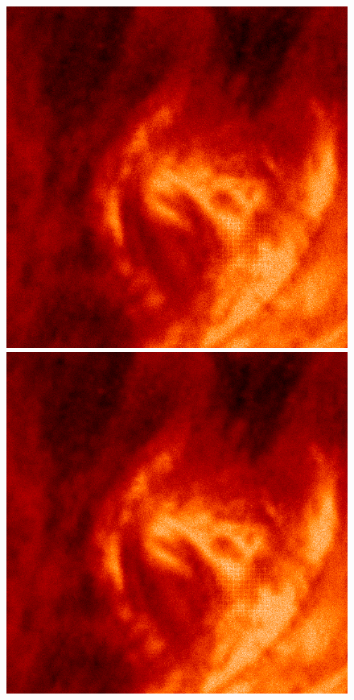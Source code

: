 \documentclass[tocnosub,noragright,centerchapter,12pt]{uiucecethesis09}
\begin{document}
\begin{figure}
{\begin{minipage}{.19\textwidth}
  \end{minipage}%
  \begin{minipage}{.19\textwidth}
    \centering
    \includegraphics[width=.95\textwidth]{figures/aia_recon80.png}
  \end{minipage}%
  \begin{minipage}{.19\textwidth}
    \centering
    \includegraphics[width=.95\textwidth]{figures/aia_recon100.png}

\end{minipage}}
\end{figure}
\end{document}
